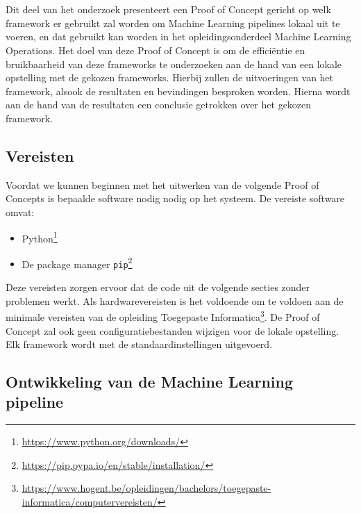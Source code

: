 \chapter{}%
\label{ch:PoC}

Dit deel van het onderzoek presenteert een Proof of Concept gericht op welk framework er gebruikt zal worden om Machine Learning pipelines lokaal uit te voeren, en dat gebruikt kan worden in het opleidingsonderdeel Machine Learning Operations.
Het doel van deze Proof of Concept is om de efficiëntie en bruikbaarheid van deze frameworks te onderzoeken aan de hand van een lokale opstelling met de gekozen frameworks. Hierbij zullen de uitvoeringen van het framework, alsook de resultaten en bevindingen besproken worden.
Hierna wordt aan de hand van de resultaten een conclusie getrokken over het gekozen framework.


\section{Vereisten}

Voordat we kunnen beginnen met het uitwerken van de volgende Proof of Concepts is bepaalde software nodig nodig op het systeem. De vereiste software omvat:

\begin{itemize}
    \item Python\footnote{\url{https://www.python.org/downloads/}}
    \item De package manager \texttt{pip}\footnote{\url{https://pip.pypa.io/en/stable/installation/}}
\end{itemize}

Deze vereisten zorgen ervoor dat de code uit de volgende secties zonder problemen werkt. Als hardwarevereisten is het voldoende om te voldoen aan de minimale vereisten van de opleiding Toegepaste Informatica\footnote{\url{https://www.hogent.be/opleidingen/bachelors/toegepaste-informatica/computervereisten/}}. De Proof of Concept zal ook geen configuratiebestanden wijzigen voor de lokale opstelling. Elk framework wordt met de standaardinstellingen uitgevoerd.

\section{Ontwikkeling van de Machine Learning pipeline}

